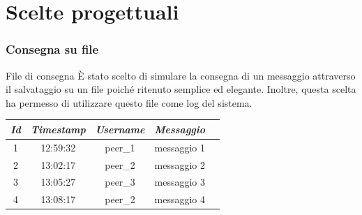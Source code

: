 \documentclass[
	usepdftitle=false,
	xcolor={table, dvipsnames},
	hyperref={
		pdftitle={Multicast totalmente e causalmente ordinato in Go},
    	pdfauthor={A. Chillotti}
    }
]{beamer}
\begin{document}
\section{Scelte progettuali}
\begin{frame}
\frametitle{Consegna su file}
\begin{block}{File di consegna}
È stato scelto di simulare la consegna di un messaggio attraverso il salvataggio su un file poiché ritenuto semplice ed elegante. Inoltre, questa scelta ha permesso di utilizzare questo file come log del sistema.

\begin{table}[ht!]
  \label{tab:file}
   \begin{adjustbox}{max width=0.5\textwidth}
  \begin{tabular}{ccccl}
    \toprule
    \textit{Id} & \textit{Timestamp} & \textit{Username} & \textit{Messaggio} \\
    \midrule
    1 & 12:59:32 & peer\_1 & messaggio 1 \\
    2 & 13:02:17 & peer\_2 & messaggio 2 \\
    3 & 13:05:27 & peer\_3 & messaggio 3 \\
    4 & 13:08:17 & peer\_2 & messaggio 4 \\
  \bottomrule
\end{tabular}
\end{adjustbox}
\end{table}

\end{block}
\end{frame}
\end{document}
